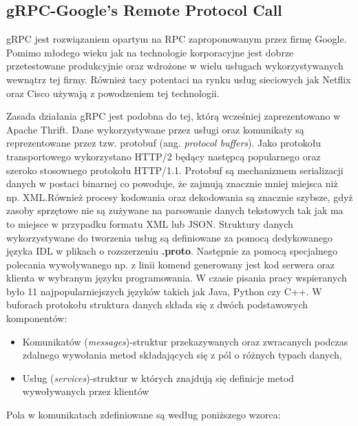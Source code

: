 \subsection{gRPC-Google's Remote Protocol Call}
gRPC jest rozwiązaniem opartym na RPC zaproponowanym przez firmę Google. Pomimo młodego wieku jak na technologie korporacyjne jest dobrze przetestowane produkcyjnie oraz wdrożone w wielu usługach wykorzystywanych wewnątrz tej firmy. Również tacy potentaci na rynku usług sieciowych jak Netflix oraz Cisco używają z powodzeniem tej technologii.
\par Zasada działania gRPC jest podobna do tej, którą wcześniej zaprezentowano w Apache Thrift. Dane wykorzystywane przez usługi oraz komunikaty są reprezentowane przez tzw. protobuf (ang. \textit{protocol buffers}). Jako protokołu transportowego wykorzystano HTTP/2 będący następcą popularnego oraz szeroko stosownego protokołu HTTP/1.1. Protobuf są mechanizmem serializacji danych w postaci binarnej co powoduje, że zajmują znacznie mniej miejsca niż np. XML.\@ Również procesy kodowania oraz dekodowania są znacznie szybsze, gdyż zasoby sprzętowe nie są zużywane na parsowanie danych tekstowych tak jak ma to miejsce w przypadku formatu XML lub JSON. Struktury danych wykorzystywane do tworzenia usług są definiowane za pomocą dedykowanego języka IDL w plikach o rozszerzeniu \textbf{.proto}. Następnie za pomocą specjalnego polecania wywoływanego np. z linii komend generowany jest kod serwera oraz klienta w wybranym języku programowania. W czasie pisania pracy wspieranych było 11 najpopularniejszych języków takich jak Java, Python czy C++. W buforach protokołu struktura danych składa się z dwóch podstawowych komponentów:
\begin{itemize}
  \item Komunikatów (\textit{messages})-struktur przekazywanych oraz zwracanych podczas zdalnego wywołania metod składających się z pól o różnych typach danych,
  \item Usług (\textit{services})-struktur w których znajdują się definicje metod wywoływanych przez klientów
\end{itemize}
\noindent
Pola w komunikatach zdefiniowane są według poniższego wzorca:


